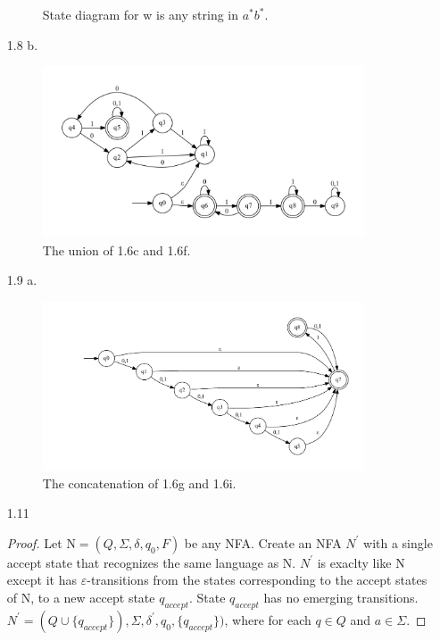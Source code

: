 \documentclass[10pt] {article}
\begin{document}
\begin{enumerate}
\begin{figure}[H]
\caption{State diagram for w is any string in $a^* b^*$.}
\label{15}
\end{figure}
\item[1.8]
b.\begin{figure}[H]
\includegraphics[width=0.9\textwidth]{816.pdf}
\caption{The union of 1.6c and 1.6f.}
\label{16}
\end{figure}
\item[1.9]
a.\begin{figure}[H]
\includegraphics[width=0.9\textwidth]{a19.pdf}
\caption{The concatenation of 1.6g and 1.6i.}
\label{17}
\end{figure}
\item[1.11]\begin{proof}
Let N$=(Q,\Sigma,\delta,q_0,F)$ be any NFA. Create an NFA $N^{'}$ with a single accept state that recognizes the same language as N. $N^{'}$ is exaclty like N except it has $\varepsilon$-transitions from the states corresponding to the accept states of N, to a new accept state $q_{accept}$. State $q_{accept}$ has no emerging transitions.$N^{'}=(Q \cup\{ q_{accept}\}),\Sigma,\delta^{'},q_0,\{ q_{accept}\})$, where for each $q \in Q$ and $a \in \Sigma$.


\end{proof}
\end{enumerate}
\end{document}
